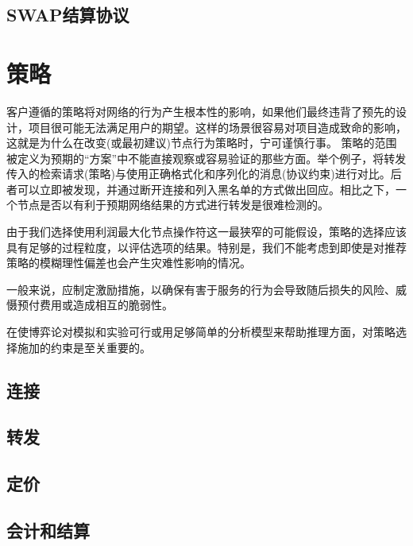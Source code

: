 \section{SWAP结算协议\statusorange}\label{spec:protocol:swap}


\chapter{策略\statusorange}\label{spec:strategy}


客户遵循的策略将对网络的行为产生根本性的影响，如果他们最终违背了预先的设计，项目很可能无法满足用户的期望。这样的场景很容易对项目造成致命的影响，这就是为什么在改变(或最初建议)节点行为策略时，宁可谨慎行事。
策略的范围被定义为预期的“方案”中不能直接观察或容易验证的那些方面。举个例子，将转发传入的检索请求(策略)与使用正确格式化和序列化的消息(协议约束)进行对比。后者可以立即被发现，并通过断开连接和列入黑名单的方式做出回应。相比之下，一个节点是否以有利于预期网络结果的方式进行转发是很难检测的。 

由于我们选择使用利润最大化节点操作符这一最狭窄的可能假设，策略的选择应该具有足够的过程粒度，以评估选项的结果。特别是，我们不能考虑到即使是对推荐策略的模糊理性偏差也会产生灾难性影响的情况。

一般来说，应制定激励措施，以确保有害于服务的行为会导致随后损失的风险、威慑预付费用或造成相互的脆弱性。 

在使博弈论对模拟和实验可行或用足够简单的分析模型来帮助推理方面，对策略选择施加的约束是至关重要的。 

\section{连接\statusorange}\label{spec:strategy:connection}


\section{转发\statusorange}\label{spec:strategy:forwarding}


\section{定价\statusorange}\label{spec:strategy:pricing}


\section{会计和结算}\label{spec:strategy:swap}


